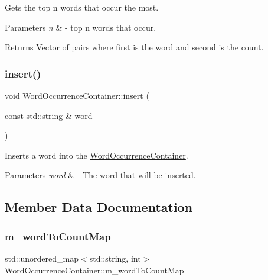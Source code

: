 Gets the top n words that occur the most. 


\begin{DoxyParams}{Parameters}
{\em n} & -\/ top n words that occur. \\
\hline
\end{DoxyParams}
\begin{DoxyReturn}{Returns}
Vector of pairs where first is the word and second is the count. 
\end{DoxyReturn}
\mbox{\label{class_word_occurrence_container_a3ea24956cdbd599593bd4c0256cf9d15}} 
\subsubsection{\texorpdfstring{insert()}{insert()}}
{\footnotesize\ttfamily void Word\+Occurrence\+Container\+::insert (\begin{DoxyParamCaption}\item[{const std\+::string \&}]{word }\end{DoxyParamCaption})}



Inserts a word into the \mbox{\hyperlink{class_word_occurrence_container}{Word\+Occurrence\+Container}}. 


\begin{DoxyParams}{Parameters}
{\em word} & -\/ The word that will be inserted. \\
\hline
\end{DoxyParams}


\subsection{Member Data Documentation}
\mbox{\label{class_word_occurrence_container_afa4a7302483fae9b9b2025c97101a685}} 
\subsubsection{\texorpdfstring{m\+\_\+word\+To\+Count\+Map}{m\_wordToCountMap}}
{\footnotesize\ttfamily std\+::unordered\+\_\+map$<$std\+::string, int$>$ Word\+Occurrence\+Container\+::m\+\_\+word\+To\+Count\+Map\hspace{0.3cm}{\ttfamily [private]}}

